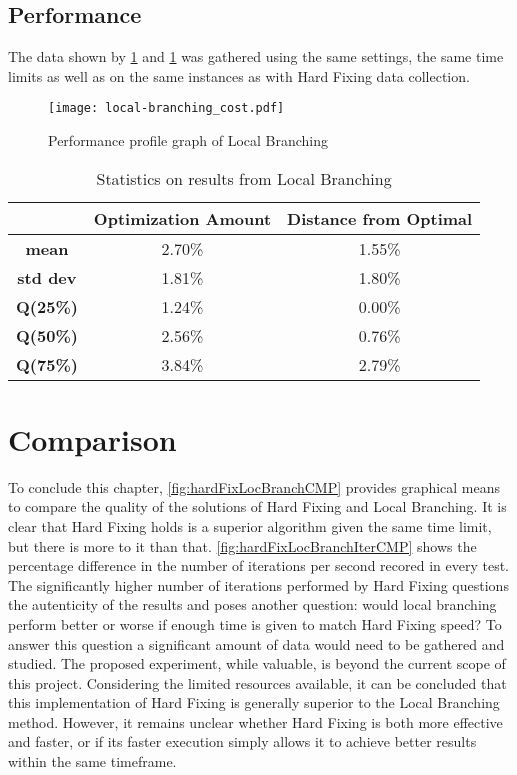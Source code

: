 \subsection{Performance}

The data shown by \figurename{ \ref{fig:localBranchingCost}} and \tablename{ \ref{tab:localBranchingStats}} was gathered using the same settings, the same time limits as well as on the same instances as with Hard Fixing data collection.

\begin{figure}[htbp]
	\centering
	\texttt{[image: local-branching\_cost.pdf]}
	\caption{Performance profile graph of Local Branching\label{fig:localBranchingCost}}
\end{figure}

\begin{table}[htbp]
	\centering
	\begin{tabular}{c|c|c|}
        & \textbf{Optimization Amount} & \textbf{Distance from Optimal} \\
		\hline \textbf{mean} & 2.70\% & 1.55\% \\
		\hline \textbf{std dev} & 1.81\% & 1.80\% \\
        \hline \textbf{Q(25\%)} & 1.24\% & 0.00\% \\
        \hline \textbf{Q(50\%)} & 2.56\% & 0.76\% \\
        \hline \textbf{Q(75\%)} & 3.84\% & 2.79\% \\
	\end{tabular}
    \vspace{2mm}
	\caption{Statistics on results from Local Branching} \label{tab:localBranchingStats}
\end{table}

\section{Comparison}
To conclude this chapter, \figurename{ \ref{fig:hardFixLocBranchCMP}} provides graphical means to compare the quality of the solutions of Hard Fixing and Local Branching.
It is clear that Hard Fixing holds is a superior algorithm given the same time limit, but there is more to it than that.
\figurename{ \ref{fig:hardFixLocBranchIterCMP}} shows the percentage difference in the number of iterations per second recored in every test.
The significantly higher number of iterations performed by Hard Fixing questions the autenticity of the results and poses another question: would local branching perform better or worse if enough time is given to match Hard Fixing speed?
To answer this question a significant amount of data would need to be gathered and studied.
The proposed experiment, while valuable, is beyond the current scope of this project.
Considering the limited resources available, it can be concluded that this implementation of Hard Fixing is generally superior to the Local Branching method.
However, it remains unclear whether Hard Fixing is both more effective and faster, or if its faster execution simply allows it to achieve better results within the same timeframe.


